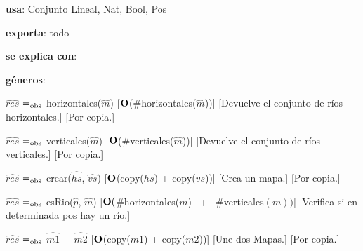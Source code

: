 \begin{Interfaz}
  
    \textbf{usa}: Conjunto Lineal, Nat, Bool, Pos

    \textbf{exporta}: todo 

    \textbf{se explica con}: 
  
    \textbf{géneros}: 
  
  
    {$\hat{res}$ $=_{\mathrm{obs}}$ horizontales($\hat{m}$)}%
    [$\bold{O}$(\#horizontales($\hat{m}$))] 
    [Devuelve el conjunto de ríos horizontales.]
    [Por copia.]

    {$\hat{res}$ $=_{\mathrm{obs}}$ verticales($\hat{m}$)}%
    [$\bold{O}$(\#verticales($\hat{m}$))] 
    [Devuelve el conjunto de ríos verticales.]
    [Por copia.]

    {$\hat{res}$ $=_{\mathrm{obs}}$ crear($\hat{hs}$, $\hat{vs}$)}%
    [$\bold{O}$(copy($hs$) + copy($vs$))] 
    [Crea un mapa.]
    [Por copia.]

    {$\hat{res}$ $=_{\mathrm{obs}}$ esRio($\hat{p}$, $\hat{m}$)}%
    [$\bold{O}($\#horizontales($m$) \ + \  \#verticales$(m))$]
    [Verifica si en determinada pos hay un río.] 

    {$\hat{res}$ $=_{\mathrm{obs}}$ $\hat{m1}$ + $\hat{m2}$}%
    [$\bold{O}$(copy($m1$) + copy($m2$))]
    [Une dos Mapas.] 
    [Por copia.]

  \end{Interfaz}